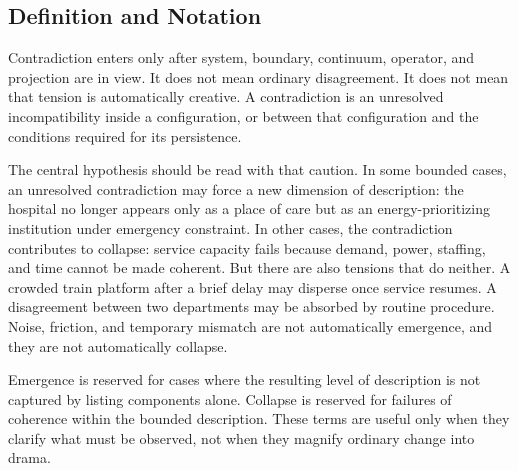\documentclass[11pt,a4paper,openany]{book}
\begin{document}
\subsection{Definition and Notation}
Contradiction enters only after system, boundary, continuum, operator, and projection are in view. It does not mean ordinary disagreement. It does not mean that tension is automatically creative. A contradiction is an unresolved incompatibility inside a configuration, or between that configuration and the conditions required for its persistence. \cite{kauffman_autocatalytic,raf_networks}\par
The central hypothesis should be read with that caution. In some bounded cases, an unresolved contradiction may force a new dimension of description: the hospital no longer appears only as a place of care but as an energy-prioritizing institution under emergency constraint. In other cases, the contradiction contributes to collapse: service capacity fails because demand, power, staffing, and time cannot be made coherent. But there are also tensions that do neither. A crowded train platform after a brief delay may disperse once service resumes. A disagreement between two departments may be absorbed by routine procedure. Noise, friction, and temporary mismatch are not automatically emergence, and they are not automatically collapse.\par
Emergence is reserved for cases where the resulting level of description is not captured by listing components alone. Collapse is reserved for failures of coherence within the bounded description. These terms are useful only when they clarify what must be observed, not when they magnify ordinary change into drama.\par
\end{document}
